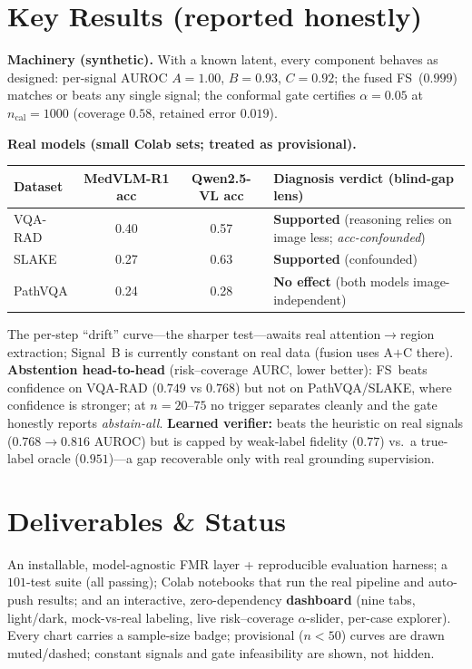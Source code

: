 \documentclass[11pt]{article}
\newcommand{\fs}{\textsc{FS}}
\begin{document}
\section{Key Results (reported honestly)}
\textbf{Machinery (synthetic).} With a known latent, every component behaves as designed:
per-signal AUROC $A{=}1.00$, $B{=}0.93$, $C{=}0.92$; the fused \fs\ ($0.999$) matches or beats
any single signal; the conformal gate certifies $\alpha{=}0.05$ at $n_{\text{cal}}{=}1000$
(coverage $0.58$, retained error $0.019$).

\textbf{Real models (small Colab sets; treated as provisional).}
\begin{center}\small
\begin{tabular}{lccl}
\toprule
Dataset & MedVLM-R1 acc & Qwen2.5-VL acc & Diagnosis verdict (blind-gap lens) \\
\midrule
VQA-RAD & 0.40 & 0.57 & \textbf{Supported} (reasoning relies on image less; \emph{acc-confounded}) \\
SLAKE   & 0.27 & 0.63 & \textbf{Supported} (confounded) \\
PathVQA & 0.24 & 0.28 & \textbf{No effect} (both models image-independent) \\
\bottomrule
\end{tabular}
\end{center}
The per-step ``drift'' curve---the sharper test---awaits real attention$\to$region
extraction; Signal~B is currently constant on real data (fusion uses A$+$C there).
\textbf{Abstention head-to-head} (risk--coverage AURC, lower better): \fs\ beats
confidence on VQA-RAD ($0.749$ vs $0.768$) but not on PathVQA/SLAKE, where confidence is
stronger; at $n{=}20\text{--}75$ no trigger separates cleanly and the gate honestly reports
\emph{abstain-all}. \textbf{Learned verifier:} beats the heuristic on real signals
($0.768\!\to\!0.816$ AUROC) but is capped by weak-label fidelity ($0.77$) vs.\ a true-label
oracle ($0.951$)---a gap recoverable only with real grounding supervision.

\section{Deliverables \& Status}
An installable, model-agnostic FMR layer + reproducible evaluation harness; a $101$-test suite
(all passing); Colab notebooks that run the real pipeline and auto-push results; and an
interactive, zero-dependency \textbf{dashboard} (nine tabs, light/dark, mock-vs-real
labeling, live risk--coverage $\alpha$-slider, per-case explorer). Every chart carries a
sample-size badge; provisional ($n{<}50$) curves are drawn muted/dashed; constant signals and
gate infeasibility are shown, not hidden.
\end{document}
